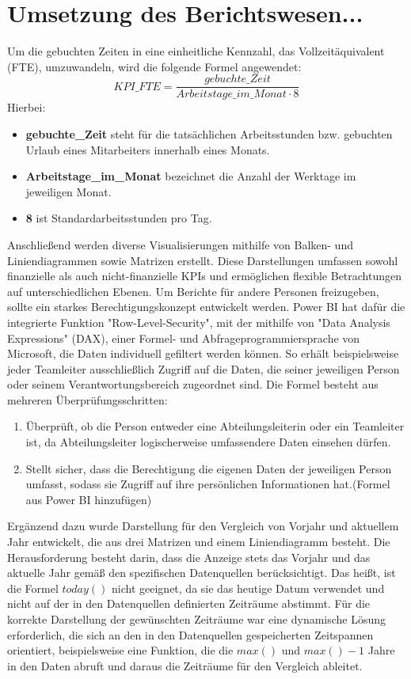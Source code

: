 \section{Umsetzung des Berichtswesen...}
Um die gebuchten Zeiten in eine einheitliche Kennzahl, das Vollzeitäquivalent (FTE), umzuwandeln, wird die folgende Formel angewendet:
\[ KPI\_FTE = \frac{gebuchte\_Zeit}{Arbeitstage\_im\_Monat \cdot 8} \] Hierbei:
\begin{itemize}
	\item \textbf{gebuchte\_Zeit} steht für die tatsächlichen Arbeitsstunden bzw. gebuchten Urlaub eines Mitarbeiters innerhalb eines Monats.
	\item \textbf{Arbeitstage\_im\_Monat} bezeichnet die Anzahl der Werktage im jeweiligen Monat.
	\item \textbf{8} ist Standardarbeitsstunden pro Tag.
\end{itemize}
Anschließend werden diverse Visualisierungen mithilfe von Balken- und Liniendiagrammen sowie Matrizen erstellt. Diese Darstellungen umfassen sowohl finanzielle als auch nicht-finanzielle KPIs und ermöglichen flexible Betrachtungen auf unterschiedlichen Ebenen.\newline
Um Berichte für andere Personen freizugeben, sollte ein starkes Berechtigungskonzept entwickelt werden. Power BI hat dafür die integrierte Funktion "Row-Level-Security", mit der mithilfe von "Data Analysis Expressions" (DAX)\cite{DAX}, einer Formel- und Abfrageprogrammiersprache von Microsoft, die Daten individuell gefiltert werden können. So erhält beispielsweise jeder Teamleiter ausschließlich Zugriff auf die Daten, die seiner jeweiligen Person oder seinem Verantwortungsbereich zugeordnet sind. Die Formel besteht aus mehreren Überprüfungsschritten:
\begin{enumerate}
	\item Überprüft, ob die Person entweder eine Abteilungsleiterin oder ein Teamleiter ist, da Abteilungsleiter logischerweise umfassendere Daten einsehen dürfen. 
	\item Stellt sicher, dass die Berechtigung die eigenen Daten der jeweiligen Person umfasst, sodass sie Zugriff auf ihre persönlichen Informationen hat.(Formel aus Power BI hinzufügen)
\end{enumerate}
Ergänzend dazu wurde Darstellung für den Vergleich von Vorjahr und aktuellem Jahr entwickelt, die aus drei Matrizen und einem Liniendiagramm besteht. Die Herausforderung besteht darin, dass die Anzeige stets das Vorjahr und das aktuelle Jahr gemäß den spezifischen Datenquellen berücksichtigt. Das heißt, ist die Formel  $today()$ nicht geeignet, da sie das heutige Datum verwendet und nicht auf der in den Datenquellen definierten Zeiträume abstimmt. Für die korrekte Darstellung der gewünschten Zeiträume war eine dynamische Lösung erforderlich, die sich an den in den Datenquellen gespeicherten Zeitspannen orientiert, beispielsweise eine Funktion, die die $max()$ und $max()-1$ Jahre in den Daten abruft und daraus die Zeiträume für den Vergleich ableitet.\newline
